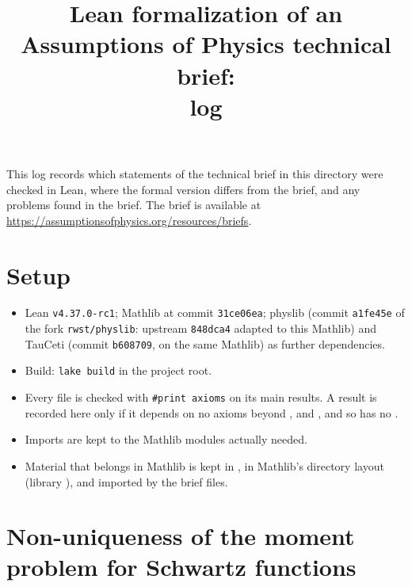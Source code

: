 \documentclass[11pt]{article}
\title{Lean formalization of an Assumptions of Physics technical brief:\\ log}
\author{}
\date{}
\begin{document}
\maketitle

\noindent
This log records which statements of the technical brief in this directory were checked in Lean,
where the formal version differs from the brief, and any problems found in the brief.
The brief is available at \url{https://assumptionsofphysics.org/resources/briefs}.

\section*{Setup}

\begin{itemize}
\item Lean \texttt{v4.37.0-rc1}; Mathlib at commit \texttt{31ce06ea}; physlib (commit \texttt{a1fe45e}
  of the fork \texttt{rwst/physlib}: upstream \texttt{848dca4} adapted to this Mathlib) and
  TauCeti (commit \texttt{b608709}, on the same Mathlib) as further dependencies.
\item Build: \texttt{lake build} in the project root.
\item Every file is checked with \texttt{\#print axioms} on its main results. A result is
  recorded here only if it depends on no axioms beyond ,
   and , and so has no .
\item Imports are kept to the Mathlib modules actually needed.
\item Material that belongs in Mathlib is kept in , in Mathlib's directory
  layout (library ), and imported by the brief files.
\end{itemize}



\section{Non-uniqueness of the moment problem for Schwartz functions}
\end{document}
